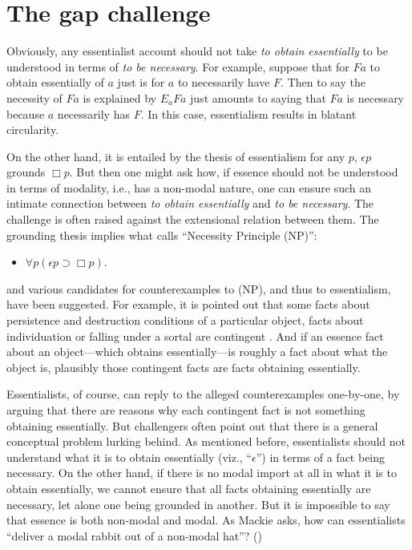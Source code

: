 \documentclass[12pt]{article}
\begin{document}
\section{The gap challenge}

Obviously, any essentialist account should not take \textit{to obtain essentially} to be understood in terms of \textit{to be necessary}. For example, suppose that for $Fa$ to obtain essentially of $a$ just is for $a$ to necessarily have $F$. Then to say the necessity of $Fa$ is explained by $E_a Fa$ just amounts to saying that $Fa$ is necessary because $a$ necessarily has $F$. In this case, essentialism results in blatant circularity. 
\par
On the other hand, it is entailed by the thesis of essentialism for any $p$, $\epsilon p$ grounds $\Box p$. But then one might ask how, if essence should not be understood in terms of modality, i.e., has a non-modal nature, one can ensure such an intimate connection between \textit{to obtain essentially} and \textit{to be necessary}. The challenge is often raised against the extensional relation between them. The grounding thesis implies what \citet{Mackie2020-MACMBE} calls ``Necessity Principle (NP)'': 
\begin{itemize}
    \item[(NP)] $\forall p (\epsilon p \supset \Box p)$.
\end{itemize}
and various candidates for counterexamples to (NP), and thus to essentialism, have been suggested. For example, it is pointed out that some facts about persistence and destruction conditions of a particular object, facts about individuation or falling under a sortal are contingent \citep{Leech2018-LEEEAM, Mackie2020-MACMBE}. And if an essence fact about an object---which obtains essentially---is roughly a fact about what the object is, plausibly those contingent facts are facts obtaining essentially. 
\par
Essentialists, of course, can reply to the alleged counterexamples one-by-one, by arguing that there are reasons why each contingent fact is not something obtaining essentially. But challengers often point out that there is a general conceptual problem lurking behind. As mentioned before, essentialists should not understand what it is to obtain essentially (viz., ``$\epsilon$'') in terms of a fact being necessary. On the other hand, if there is no modal import at all in what it is to obtain essentially, we cannot ensure that all facts obtaining essentially are necessary, let alone one being grounded in another. But it is impossible to say that essence is both non-modal and modal. As Mackie asks, how can essentialists ``deliver a modal rabbit out of a non-modal hat''? (\citeyear[252]{Mackie2020-MACMBE})
\end{document}
